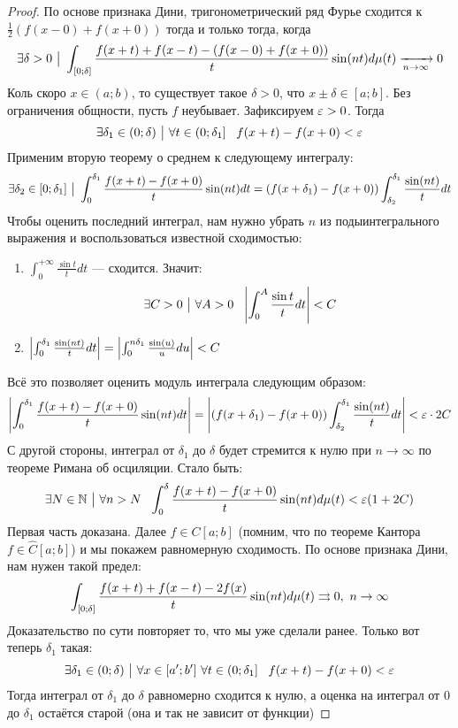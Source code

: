 \begin{proof}
	По основе признака Дини, тригонометрический ряд Фурье сходится к $\frac{1}{2}(f(x - 0) + f(x + 0))$ тогда и только тогда, когда
	\[
		\exists \delta > 0 \ \big|\  \int_{[0; \delta]} \frac{f(x + t) + f(x - t) - (f(x - 0) + f(x + 0))}{t}\sin(nt)d\mu(t) \xrightarrow[n \to \infty]{} 0
	\]
	Коль скоро $x \in (a; b)$, то существует такое $\delta > 0$, что $x \pm \delta \in [a; b]$. Без ограничения общности, пусть $f$ неубывает. Зафиксируем $\varepsilon > 0$. Тогда
	\[
		\exists \delta_1 \in (0; \delta) \ \big|\  \forall t \in \left(0; \delta_1\right]\ \ f(x + t) - f(x + 0) < \varepsilon
	\]
	Применим вторую теорему о среднем к следующему интегралу:
	\[
		\exists \delta_2 \in [0; \delta_1] \ \big|\  \int_0^{\delta_1} \frac{f(x + t) - f(x + 0)}{t}\sin(nt)dt = (f(x + \delta_1) - f(x + 0)) \int_{\delta_2}^{\delta_1} \frac{\sin(nt)}{t}dt
	\]
	Чтобы оценить последний интеграл, нам нужно убрать $n$ из подыинтегрального выражения и воспользоваться известной сходимостью:
	\begin{enumerate}
		\item $\int_0^{+\infty} \frac{\sin t}{t}dt$ --- сходится. Значит:
		\[
			\exists C > 0 \ \big|\  \forall A > 0\ \ \left|\int_0^A \frac{\sin t}{t}dt\right| < C
		\]
		
		\item \(\left|\int_0^{\delta_1} \frac{\sin(nt)}{t}dt\right| = \left|\int_0^{n\delta_1} \frac{\sin(u)}{u}du\right| < C\)
	\end{enumerate}
	Всё это позволяет оценить модуль интеграла следующим образом:
	\[
		\left|\int_0^{\delta_1} \frac{f(x + t) - f(x + 0)}{t}\sin(nt)dt\right| = \left|(f(x + \delta_1) - f(x + 0)) \int_{\delta_2}^{\delta_1} \frac{\sin(nt)}{t}dt\right| <
		\\
		\varepsilon \cdot 2C
	\]
	С другой стороны, интеграл от $\delta_1$ до $\delta$ будет стремится к нулю при $n \to \infty$ по теореме Римана об осциляции. Стало быть:
	\[
		\exists N \in \N \such \forall n > N\ \ \int_0^{\delta} \frac{f(x + t) - f(x + 0)}{t} \sin(nt)d\mu(t) < \eps(1 + 2C)
	\]
	Первая часть доказана. Далее $f \in C[a; b]$ (помним, что по теореме Кантора $f \in \hat{C}[a; b]$) и мы покажем равномерную сходимость. По основе признака Дини, нам нужен такой предел:
	\[
		\int_{[0; \delta]} \frac{f(x + t) + f(x - t) - 2f(x)}{t}\sin(nt)d\mu(t) \rightrightarrows 0,\ n \to \infty
	\]
	Доказательство по сути повторяет то, что мы уже сделали ранее. Только вот теперь $\delta_1$ такая:
	\[
		\exists \delta_1 \in (0; \delta) \ \big|\  \forall x \in [a'; b']\ \forall t \in \left(0; \delta_1\right]\ \ f(x + t) - f(x + 0) < \varepsilon
	\]
	Тогда интеграл от $\delta_1$ до $\delta$ равномерно сходится к нулю, а оценка на интеграл от 0 до $\delta_1$ остаётся старой (она и так не зависит от функции)
\end{proof}


